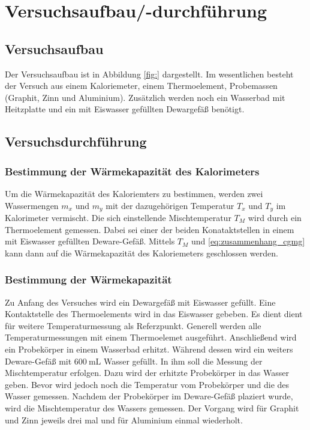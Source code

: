 \section{Versuchsaufbau/-durchführung}

\subsection{Versuchsaufbau}

Der Versuchsaufbau ist in Abbildung \ref{fig:} dargestellt.
Im wesentlichen besteht der Versuch aus einem Kaloriemeter, einem Thermoelement,
Probemassen (Graphit, Zinn und Aluminium).
Zusätzlich werden noch ein Wasserbad mit Heitzplatte und
ein mit Eiswasser gefüllten Dewargefäß benötigt.

\subsection{Versuchsdurchführung}

\subsubsection{Bestimmung der Wärmekapazität des Kalorimeters}
Um die Wärmekapazität des Kaloriemters zu bestimmen, werden 
zwei Wassermengen $m_x$ und $m_y$ mit der dazugehörigen Temperatur $T_x$ und $T_y$ 
im Kalorimeter vermischt. 
Die sich einstellende Mischtemperatur $T_M$ wird durch ein Thermoelement gemessen.
Dabei sei einer der beiden Konataktstellen
in einem mit Eiswasser gefüllten Deware-Gefäß.
Mittels $T_M$ und \eqref{eq:zusammenhang_cgmg} kann dann auf die Wärmekapazität des 
Kaloriemeters geschlossen werden.

\subsubsection{Bestimmung der Wärmekapazität}
Zu Anfang des Versuches wird ein Dewargefäß mit Eiswasser gefüllt.
Eine Kontaktstelle des Thermoelements wird in das Eiswasser gebeben.
Es dient dient für weitere Temperaturmessung als Referzpunkt.
Generell werden alle Temperaturmessungen mit einem Thermoelemet ausgeführt.
Anschließend wird ein Probekörper in einem Wasserbad erhitzt.
Während dessen wird ein weiters Deware-Gefäß mit $\SI{600}{\milli\liter}$ Wasser gefüllt.
In ihm soll die Messung der Mischtemperatur erfolgen.
Dazu wird der erhitzte Probekörper in das Wasser geben.
Bevor wird jedoch noch die Temperatur vom Probekörper und die des Wasser gemessen.
Nachdem der Probekörper im Deware-Gefäß plaziert wurde, wird die Mischtemperatur des
Wassers gemessen. Der Vorgang wird für Graphit und Zinn jeweils drei mal und für
Aluminium einmal wiederholt.

